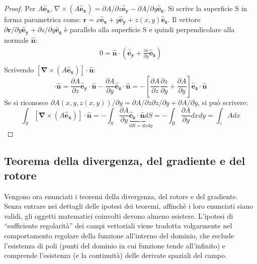 \begin{proof}
 Per $A\bm{\hat{e}_x}$, ${\nabla} \times (A \bm{\hat{e}_x}) = 
{\partial A}/{\partial z} \bm{\hat{e}_y} - {\partial A}/{\partial y} \mathbf{\hat{e}_z}$.
Si scrive la superficie S in forma parametrica come: $\bm{r} = x\bm{\hat{e}_x} +
y\bm{\hat{e}_y} + z(x,y)\bm{\hat{e}_z}$. Il vettore ${\partial \bm{r}}/{\partial y} \bm{\hat{e}_y} + 
{\partial z}/{\partial y} \bm{\hat{e}_z} $ è parallelo alla 
superficie S e quindi perpendicolare alla normale $\bm{\hat{n}}$: 
\begin{equation}
\begin{aligned}
0 = \bm{\hat{n}} \cdot \displaystyle \left(\bm{\hat{e}_y} + 
\frac{\partial z}{\partial y} \bm{\hat{e}_z} \right) \\
\end{aligned}
\end{equation}
%
Scrivendo  $[\bm{\nabla} \times (A \bm{\hat{e}_x})] \cdot \bm{\hat{n}}$:
\begin{equation}
 [\bm{\nabla} \times (A \bm{\hat{e}_x})] \cdot \bm{\hat{n}} = 
  \frac{\partial A}{\partial z} \bm{\hat{e}_y} \cdot \bm{\hat{n}}
   - \frac{\partial A}{\partial y} \bm{\hat{e}_z}\cdot \bm{\hat{n}} =
  - \displaystyle\left[ \frac{\partial A}{\partial z} \frac{\partial z}{\partial y} +
  \frac{\partial A}{\partial y}  \right] \bm{\hat{e}_z}\cdot \bm{\hat{n}}
\end{equation}
%
Se si riconosce ${\partial A(x,y,z(x,y))}/{\partial y} = {\partial A}/{\partial z} {\partial z}/{\partial y} +
  {\partial A}/{\partial y}$, si può scrivere:
\begin{equation}
 \int_S [\bm{\nabla} \times (A \bm{\hat{e}_x})] \cdot \bm{\hat{n}} =
 - \int_S \frac{\partial A}{\partial y} \underbrace{\bm{\hat{e}_z}\cdot \bm{\hat{n}} dS}_{dR = dx dy} = 
 - \int_R \frac{\partial A}{\partial y} dx dy = \int_\gamma A dx
\end{equation}
%
\end{proof}


\subsection{Teorema della divergenza, del gradiente e del rotore}
Vengono ora enunciati i teoremi della divergenza, del rotore e del gradiente. Senza entrare nei dettagli delle ipotesi dei teoremi, affinchè i loro enunciati siano validi, gli oggetti matematici coinvolti devono almeno esistere. L'ipotesi di ``sufficiente regolarità'' dei campi vettoriali viene tradotta volgarmente nel comportamento regolare della funzione all'interno del dominio, che esclude l'esistenza di poli (punti del dominio in cui funzione tende all'infinito) e comprende l'esistenza (e la continuità) delle derivate spaziali del campo.
%

